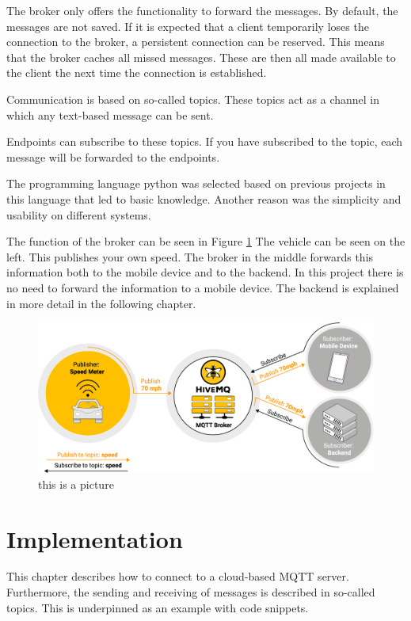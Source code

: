 The broker only offers the functionality to forward the messages. By default, the messages are not saved. If it is expected that a client temporarily loses the connection to the broker, a persistent connection can be reserved. This means that the broker caches all missed messages. These are then all made available to the client the next time the connection is established.

Communication is based on so-called topics. These topics act as a channel in which any text-based message can be sent.

Endpoints can subscribe to these topics. If you have subscribed to the topic, each message will be forwarded to the endpoints.

The programming language python was selected based on previous projects in this language that led to basic knowledge. Another reason was the simplicity and usability on different systems.

The function of the broker can be seen in Figure \ref{mqttFunktion} The vehicle can be seen on the left. This publishes your own speed. The broker in the middle forwards this information both to the mobile device and to the backend. In this project there is no need to forward the information to a mobile device. The backend is explained in more detail in the following chapter.
\begin{figure}
\sidecaption
\includegraphics[scale=.25]{chapters/chapter1_dominic/mqtt.png}
\caption{this is a picture}
\label{mqttFunktion}
\end{figure}

\section{Implementation}
\label{sec:4}
This chapter describes how to connect to a cloud-based MQTT server. Furthermore, the sending and receiving of messages is described in so-called topics. This is underpinned as an example with code snippets.
